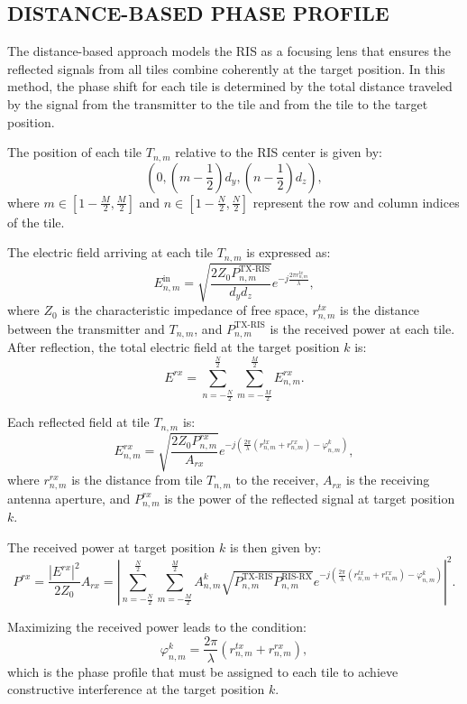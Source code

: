 \documentclass{IEEEoj}
\begin{document}
\subsection{DISTANCE-BASED PHASE PROFILE}
The distance-based approach models the RIS as a focusing lens that ensures the reflected signals from all tiles combine coherently at the target position. In this method, the phase shift for each tile is determined by the total distance traveled by the signal from the transmitter to the tile and from the tile to the target position.

The position of each tile \( T_{n,m} \) relative to the RIS center is given by:
\[
(0, (m-\frac{1}{2})d_y, (n-\frac{1}{2})d_z),
\]
where \( m \in \left[ 1 - \frac{M}{2}, \frac{M}{2} \right] \) and \( n \in \left[ 1 - \frac{N}{2}, \frac{N}{2} \right] \) represent the row and column indices of the tile.

The electric field arriving at each tile \( T_{n,m} \) is expressed as:
\[
E_{n,m}^{\text{in}} = \sqrt{\frac{2 Z_0 P_{n,m}^{\text{TX-RIS}}}{d_y d_z}} e^{-j \frac{2 \pi r_{n,m}^{tx}}{\lambda}},
\]
where \( Z_0 \) is the characteristic impedance of free space, \( r_{n,m}^{tx} \) is the distance between the transmitter and \( T_{n,m} \), and \( P_{n,m}^{\text{TX-RIS}} \) is the received power at each tile. After reflection, the total electric field at the target position \( k \) is:
\[
E^{rx} = \sum_{n=-\frac{N}{2}}^{\frac{N}{2}} \sum_{m=-\frac{M}{2}}^{\frac{M}{2}} E_{n,m}^{rx}.
\]

Each reflected field at tile \( T_{n,m} \) is:
\[
E_{n,m}^{rx} = \sqrt{\frac{2 Z_0 P^{rx}_{n,m}}{A_{rx}}} e^{-j \left( \frac{2 \pi}{\lambda} \left( r_{n,m}^{tx} + r_{n,m}^{rx} \right) - \varphi_{n,m}^k \right)},
\]
where \( r_{n,m}^{rx} \) is the distance from tile \( T_{n,m} \) to the receiver, \( A_{rx} \) is the receiving antenna aperture, and \( P_{n,m}^{rx} \) is the power of the reflected signal at target position \( k \).

The received power at target position \( k \) is then given by:
\[
P^{rx} = \frac{\left| E^{rx} \right|^2}{2 Z_0} A_{rx} = \left| \sum_{n=-\frac{N}{2}}^{\frac{N}{2}} \sum_{m=-\frac{M}{2}}^{\frac{M}{2}} A_{n,m}^k \sqrt{P_{n,m}^{\text{TX-RIS}} P_{n,m}^{\text{RIS-RX}}} e^{-j \left( \frac{2 \pi}{\lambda} \left( r_{n,m}^{tx} + r_{n,m}^{rx} \right) - \varphi_{n,m}^k \right)} \right|^2.
\]

Maximizing the received power leads to the condition:
\[
\varphi_{n,m}^k = \frac{2 \pi}{\lambda} \left( r_{n,m}^{tx} + r_{n,m}^{rx} \right),
\]
which is the phase profile that must be assigned to each tile to achieve constructive interference at the target position \( k \).
\end{document}
